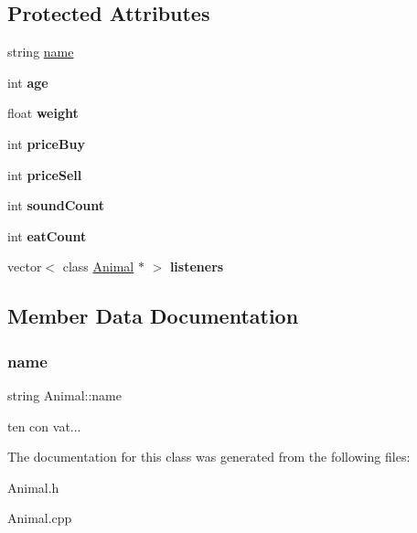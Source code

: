 \subsection*{Protected Attributes}
\begin{DoxyCompactItemize}
\item 
string \hyperlink{class_animal_a9cf3bfd9070daec7b3bbc87cbd958f35}{name}
\item 
\mbox{\label{class_animal_a31e4a23bef9596927496de4eb6b9c721}} 
int {\bfseries age}
\item 
\mbox{\label{class_animal_a055c4df7dacb89eb4c2ca9bbee11ff24}} 
float {\bfseries weight}
\item 
\mbox{\label{class_animal_ae18bdb6ca2de33354df5d877f159fb5b}} 
int {\bfseries price\+Buy}
\item 
\mbox{\label{class_animal_a5386cd93699ab24f8faddc3a2bfeea99}} 
int {\bfseries price\+Sell}
\item 
\mbox{\label{class_animal_a386cf61e5b26f85531a56cdefbae3784}} 
int {\bfseries sound\+Count}
\item 
\mbox{\label{class_animal_a4819eec8f0cb2e20cd40328db1d313d8}} 
int {\bfseries eat\+Count}
\item 
\mbox{\label{class_animal_a879d60e66aa0634fce78f9b680205d25}} 
vector$<$ class \hyperlink{class_animal}{Animal} $\ast$ $>$ {\bfseries listeners}
\end{DoxyCompactItemize}


\subsection{Member Data Documentation}
\mbox{\label{class_animal_a9cf3bfd9070daec7b3bbc87cbd958f35}} 
\subsubsection{\texorpdfstring{name}{name}}
{\footnotesize\ttfamily string Animal\+::name\hspace{0.3cm}{\ttfamily [protected]}}

ten con vat... 

The documentation for this class was generated from the following files\+:\begin{DoxyCompactItemize}
\item 
Animal.\+h\item 
Animal.\+cpp\end{DoxyCompactItemize}
